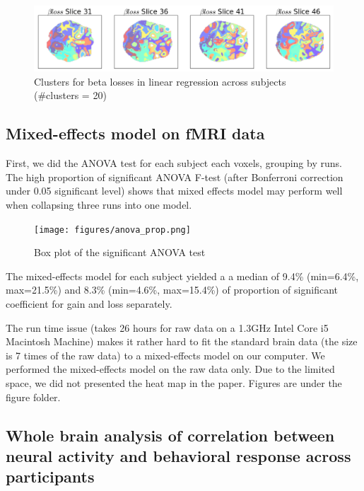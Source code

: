 \documentclass[11pt]{article}
\begin{document}
\begin{figure}[H]
    \centering
      \includegraphics[scale=0.4]{figures/Regression2/beta_loss_cluster.png}
    \caption{Clusters for beta losses in linear regression across subjects 
    (\#clusters = 20)}
\end{figure}


\subsection{Mixed-effects model on fMRI data}
First, we did the ANOVA test for each subject each voxels, grouping by runs. 
The high proportion of significant ANOVA F-test (after Bonferroni correction 
under 0.05 significant level) shows that mixed effects model may perform well 
when collapsing three runs into one model. 
\begin{figure}[H]
    \centering
        \texttt{[image: figures/anova\_prop.png]}
\caption{Box plot of the significant ANOVA test}
\end{figure}
The mixed-effects model for each subject yielded a a median of 9.4\% (min=6.4\%, 
max=21.5\%) and 8.3\% (min=4.6\%, max=15.4\%) of proportion of significant 
coefficient for gain and loss separately. 

The run time issue (takes 26 hours for raw data on a 1.3GHz Intel Core i5 
Macintosh Machine) makes it rather hard to fit the standard brain data (the 
size is 7 times of the raw data) to a mixed-effects model on our computer. 
We performed the mixed-effects model on the raw data only. Due to the limited 
space, we did not presented the heat map in the paper. Figures are under the 
figure folder.

\newpage

\subsection{Whole brain analysis of correlation between neural activity and 
behavioral response across participants}
\end{document}
